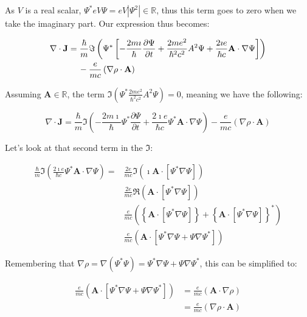 \documentclass{article}
\begin{document}
As $V$ is a real scalar, $\Psi^* eV\Psi = eV |\Psi^2| \in \mathbb{R}$, thus
this term goes to zero when we take the imaginary part. Our expression thus
becomes:

\begin{align}
    \nabla \cdot \mathbf{J} &= \frac{\hbar}{m}
    \Im\left(\Psi^*\left[-\frac{2m\imath}{\hbar}\frac{\partial\Psi}{\partial t}
    + \frac{2me^2}{\hbar^2 c^2}A^2 \Psi + \frac{2\imath e}{\hbar c}\mathbf{A}
    \cdot \nabla \Psi \right]\right) \notag \\
    & \hspace{12pt} - \frac{e}{mc}\left(\nabla \rho \cdot
    \mathbf{A}\right) \\
\end{align}

Assuming $\mathbf{A} \in \mathbb{R}$, the term
$\Im\left(\Psi^*\frac{2me^2}{\hbar^2c^2}A^2\Psi\right) = 0$, meaning we have the
following:

\begin{equation}
    \nabla \cdot \mathbf{J} =
    \frac{\hbar}{m}\Im\left(-\frac{2m\imath}{\hbar}\Psi^*\frac{\partial\Psi}{\partial
    t} + \frac{2\imath e}{\hbar c}\Psi^* \mathbf{A} \cdot \nabla \Psi\right) -
    \frac{e}{mc}\left(\nabla\rho \cdot \mathbf{A}\right)
    \label{eqn:penultimate}
\end{equation}

Let's look at that second term in the $\Im$:

\begin{align}
    \frac{\hbar}{m}\Im\left(\frac{2\imath e}{\hbar c} \Psi^* \mathbf{A} \cdot
    \nabla \Psi\right) =&
    \frac{2e}{mc}\Im\left(\imath\mathbf{A}\cdot[\Psi^*\nabla\Psi]\right) \\
    & \frac{2e}{mc}\Re\left(\mathbf{A}\cdot[\Psi^*\nabla\Psi]\right) \\
    & \frac{e}{mc}\left(\left\{\mathbf{A} \cdot [\Psi^*\nabla\Psi]\right\} +
    \left\{\mathbf{A} \cdot [\Psi^*\nabla\Psi]\right\}^*\right) \\
    & \frac{e}{mc}\left( \mathbf{A} \cdot [ \Psi^*\nabla\Psi + \Psi\nabla\Psi^*
    ] \right)
\end{align}

Remembering that $\nabla\rho = \nabla(\Psi^*\Psi) = \Psi^*\nabla\Psi + \Psi\nabla\Psi^*$,
this can be simplified to:

\begin{align}
    \frac{e}{mc}(\mathbf{A}\cdot[\Psi^*\nabla\Psi + \Psi\nabla\Psi^*]) &=
    \frac{e}{mc}(\mathbf{A}\cdot\nabla\rho) \\
    &= \frac{e}{mc}(\nabla\rho\cdot\mathbf{A})
\end{align}
\end{document}
